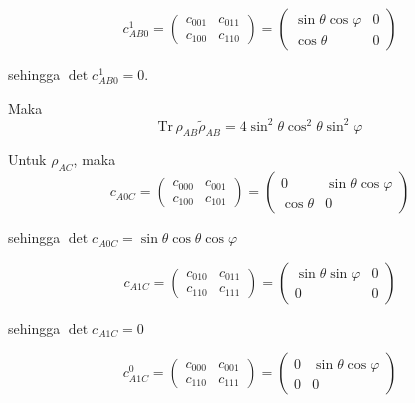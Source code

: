 \begin{enumerate}
	\begin{equation}
		c_{AB0}^1=
		\begin{pmatrix}
			c_{001} & c_{011} \\
			c_{100} & c_{110}
		\end{pmatrix}=
		\begin{pmatrix}
			\sin\theta\cos\varphi & 0 \\
			\cos\theta & 0
		\end{pmatrix}
	\end{equation}
	
	sehingga $\det c_{AB0}^1 = 0$.
	
	Maka
	\begin{equation}
		\mathrm{Tr}\,\rho_{AB}\tilde{\rho}_{AB}=4\sin^2\theta \cos^2\theta \sin^2\varphi	
	\end{equation}
	
	Untuk $\rho_{AC}$, maka
	\begin{equation}
		c_{A0C}=
		\begin{pmatrix}
			c_{000} & c_{001} \\
			c_{100} & c_{101}
		\end{pmatrix}=
		\begin{pmatrix}
			0 & \sin\theta\cos\varphi \\
			\cos\theta & 0
		\end{pmatrix}
	\end{equation}
	
	sehingga $\det c_{A0C} = \sin\theta\cos\theta\cos\varphi$
	
	\begin{equation}
		c_{A1C}=
		\begin{pmatrix}
			c_{010} & c_{011} \\
			c_{110} & c_{111}
		\end{pmatrix}=
		\begin{pmatrix}
			\sin\theta\sin\varphi & 0 \\
			0 & 0
		\end{pmatrix}
	\end{equation}
	
	sehingga $\det c_{A1C} = 0$
	
	\begin{equation}
		c_{A1C}^0=
		\begin{pmatrix}
			c_{000} & c_{001} \\
			c_{110} & c_{111}
		\end{pmatrix}=
		\begin{pmatrix}
			0 & \sin\theta\cos\varphi \\
			0 & 0
		\end{pmatrix}
	\end{equation}
	

\end{enumerate}

